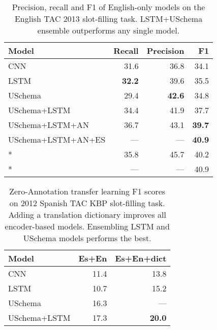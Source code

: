\begin{table}[tb]
\begin{center}
\caption{Precision, recall and F1 of English-only models on the English TAC 2013 slot-filling task. LSTM+USchema ensemble outperforms any single model. \label{en-tac-table}}
\begin{tabular}{|lrrr|}
\hline
\bf Model & \bf Recall & \bf Precision & \bf F1 \\
\hline\hline
CNN                 & 31.6 & 36.8 & 34.1 \\
LSTM                & \bf 32.2 & 39.6 & 35.5  \\
USchema             & 29.4 & \bf 42.6 & 34.8 \\
\hline
USchema+LSTM        & 34.4 & 41.9 & 37.7 \\
USchema+LSTM+AN	& 36.7 & 43.1 & \bf 39.7 \\
USchema+LSTM+AN+ES	& --- & --- & \bf 40.9 \\
\hline
\hline
\cite{roth2014relationfactory}* & 35.8 & 45.7 & 40.2 \\
\cite{angeli2014stanford}* & --- & --- & 40.9 \\
\hline
\end{tabular}
\end{center}
\end{table}



\begin{table}[h!]

\begin{center}
\caption{Zero-Annotation transfer learning F1 scores on 2012 Spanish TAC KBP slot-filling task. Adding a translation dictionary improves all encoder-based models. Ensembling LSTM and USchema models performs the best. \label{es-tac-table}}
\begin{tabular}{|lrr|}
\hline
\bf Model & \bf Es+En & \bf Es+En+dict  \\
\hline\hline
CNN 		                    & 11.4     & 13.8	\\
LSTM 	                        & 10.7     & 15.2   \\
USchema                         & 16.3     & --- \\
\hline
USchema+LSTM                    & 17.3     & \bf 20.0 \\
\hline
\end{tabular}
\end{center}
\end{table}



